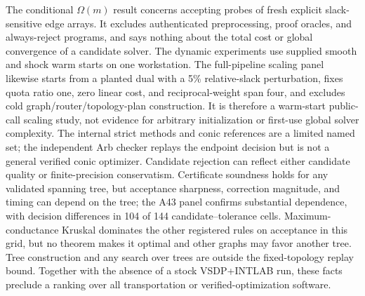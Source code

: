 \documentclass[smallextended,envcountsect]{svjour3}
\begin{document}
The conditional $\Omega(m)$ result concerns accepting probes of fresh explicit
slack-sensitive edge arrays.  It excludes authenticated preprocessing, proof
oracles, and always-reject programs, and says nothing about the total cost or
global convergence of a candidate solver.  The dynamic experiments use supplied
smooth and shock warm starts on one workstation.  The full-pipeline scaling
panel likewise starts from a planted dual with a 5\% relative-slack
perturbation, fixes quota ratio one, zero linear cost, and reciprocal-weight
span four, and excludes cold graph/router/topology-plan construction.  It is
therefore a warm-start public-call scaling study, not evidence for arbitrary
initialization or first-use global solver complexity.  The internal strict methods
and conic references are a limited named set; the independent Arb checker
replays the endpoint decision but is not a general verified conic optimizer.
Candidate rejection can reflect either candidate quality or finite-precision
conservatism.  Certificate soundness holds for any validated spanning tree, but
acceptance sharpness, correction magnitude, and timing can depend on the tree;
the A43 panel confirms substantial dependence, with decision differences in
104 of 144 candidate--tolerance cells.  Maximum-conductance Kruskal dominates
the other registered rules on acceptance in this grid, but no theorem makes it
optimal and other graphs may favor another tree.  Tree construction and any
search over trees are outside the fixed-topology replay bound.  Together with
the absence of a stock VSDP+INTLAB run,
these facts preclude a ranking over all
transportation or verified-optimization software.
\end{document}
